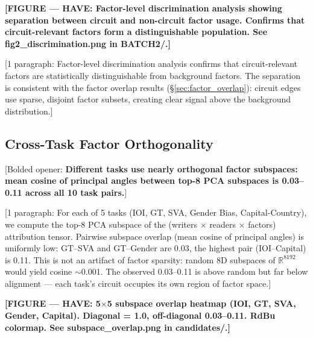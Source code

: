 \documentclass[11pt]{article}
\begin{document}

\textbf{[FIGURE --- HAVE: Factor-level discrimination analysis showing
separation between circuit and non-circuit factor usage. Confirms that
circuit-relevant factors form a distinguishable population.
See fig2\_discrimination.png in BATCH2/.]}

[1 paragraph: Factor-level discrimination analysis confirms that
circuit-relevant factors are statistically distinguishable from
background factors. The separation is consistent with the factor overlap
results (\S\ref{sec:factor_overlap}): circuit edges use sparse, disjoint
factor subsets, creating clear signal above the background distribution.]



\subsection{Cross-Task Factor Orthogonality}
\label{sec:cross_task_orthogonality}


[Bolded opener: \textbf{Different tasks use nearly orthogonal factor
subspaces: mean cosine of principal angles between top-8 PCA subspaces
is 0.03--0.11 across all 10 task pairs.}]

[1 paragraph: For each of 5 tasks (IOI, GT, SVA, Gender Bias,
Capital-Country), we compute the top-8 PCA subspace of the
(writers $\times$ readers $\times$ factors) attribution tensor. Pairwise
subspace overlap (mean cosine of principal angles) is uniformly low:
GT--SVA and GT--Gender are 0.03, the highest pair (IOI--Capital) is
0.11. This is not an artifact of factor sparsity: random 8D subspaces
of $\mathbb{R}^{8192}$ would yield cosine $\sim$0.001. The observed
0.03--0.11 is above random but far below alignment --- each task's
circuit occupies its own region of factor space.]

\textbf{[FIGURE --- HAVE: 5$\times$5 subspace overlap heatmap (IOI, GT,
SVA, Gender, Capital). Diagonal = 1.0, off-diagonal 0.03--0.11.
RdBu colormap. See subspace\_overlap.png in candidates/.]}
\end{document}
